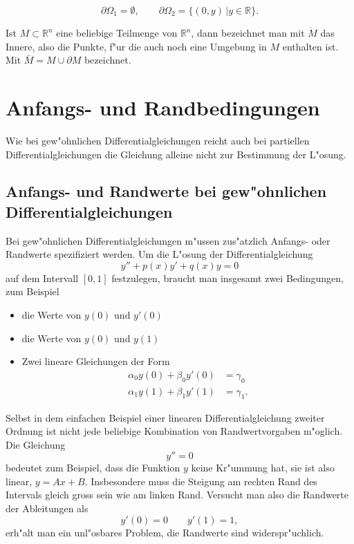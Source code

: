 \begin{beispiel}
\[
\partial \Omega_1=\emptyset,\qquad\partial \Omega_2=\{(0,y)\,|y\in\mathbb R\}.
\]
\end{beispiel}

\begin{definition}
Ist $M\subset\mathbb R^n$ eine beliebige Teilmenge von $\mathbb R^n$,
dann bezeichnet man mit $\mathring M$ das Innere, also die Punkte,
f"ur die auch noch eine Umgebung in $M$ enthalten ist. Mit
$\bar M=M\cup\partial M$ bezeichnet.
\end{definition}

\section{Anfangs- und Randbedingungen\label{klassifikation:randbedingungen}}
Wie bei gew"ohnlichen Differentialgleichungen reicht auch bei
partiellen Differentialgleichungen die Gleichung alleine nicht
zur Bestimmung der L"osung.
\subsection{Anfangs- und Randwerte bei gew"ohnlichen Differentialgleichungen\label{klassifkation:anfangswerte-ode}}
Bei gew"ohnlichen Differentialgleichungen
m"ussen zus"atzlich Anfangs- oder Randwerte spezifiziert werden.
Um die L"osung der Differentialgleichung
\[
y''+p(x)y'+q(x)y=0
\]
auf dem Intervall $[0,1]$
festzulegen, braucht man insgesamt zwei Bedingungen, zum Beispiel
\begin{itemize}
\item die Werte von $y(0)$ und $y'(0)$
\item die Werte von $y(0)$ und $y(1)$
\item Zwei lineare Gleichungen der Form
\begin{align*}
\alpha_0y(0)+\beta_0y'(0)&=\gamma_0\\
\alpha_1y(1)+\beta_1y'(1)&=\gamma_1.
\end{align*}
\end{itemize}

\begin{beispiel}
Selbst in dem einfachen Beispiel einer linearen Differentialgleichung
zweiter Ordnung ist nicht jede beliebige Kombination von Randwertvorgaben
m"oglich. Die Gleichung
\[
y''=0
\]
bedeutet zum Beispiel, dass die Funktion $y$ keine Kr"ummung hat, sie
ist also linear, $y=Ax+B$. Insbesondere muss die Steigung am rechten
Rand des Intervals gleich gross sein wie am linken Rand. Versucht man
also die Randwerte der Ableitungen als
\[
y'(0)=0\qquad y'(1)=1,
\]
erh"alt man ein unl"osbares Problem, die Randwerte sind widerspr"uchlich.
\end{beispiel}

